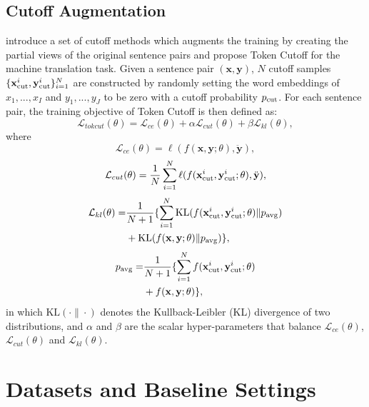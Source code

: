 \documentclass[11pt]{article}
\begin{document}
\subsection{Cutoff Augmentation}

\citet{shen2020simple} introduce a set of cutoff methods which augments the training by creating the partial views of the original sentence pairs and propose Token Cutoff for the machine translation task. Given a sentence pair $( \mathbf{x}, \mathbf{y})$, $N$ cutoff samples $\{ \mathbf{x}^i_{\rm cut}, \mathbf{y}^i_{\rm cut} \}_{i=1}^N$ are constructed by randomly setting the word embeddings of $x_1, ..., x_I$ and $y_1, ..., y_J$ to be zero with a cutoff probability $p_{\rm cut}$. For each sentence pair, the training objective of Token Cutoff is then defined as:
\begin{equation}\label{token_cutoff}
\mathcal{L}_{tokcut}(\theta) = \mathcal{L}_{ce}(\theta) + \alpha \mathcal{L}_{cut}(\theta) + \beta \mathcal{L}_{kl}(\theta),
\end{equation}
where
\begin{equation}
\mathcal{L}_{ce}(\theta) = \ell(f(\mathbf{x}, \mathbf{y}; \theta), \ddot{\mathbf{y}}),
\end{equation}
\begin{equation}
\mathcal{L}_{cut}(\theta) = \frac{1}{N}\sum_{i=1}^N\ell(f(\mathbf{x}^i_{\rm cut}, \mathbf{y}^i_{\rm cut}; \theta), \ddot{\mathbf{y}}),
\end{equation}
\begin{align}
\mathcal{L}_{kl}(\theta) = & \frac{1}{N+1} \{ \sum_{i=1}^N \text{KL}(f(\mathbf{x}^i_{\rm cut}, \mathbf{y}^i_{\rm cut}; \theta) \| p_{\rm avg}) \nonumber \\
& + \text{KL}(f(\mathbf{x}, \mathbf{y}; \theta) \| p_{\rm avg}) \},
\end{align}
\begin{align}
p_{\rm avg} = & \frac{1}{N+1} \{ \sum_{i=1}^N f(\mathbf{x}^i_{\rm cut}, \mathbf{y}^i_{\rm cut}; \theta) \nonumber \\
& + f(\mathbf{x}, \mathbf{y}; \theta) \},
\end{align}
in which $\text{KL}(\cdot \| \cdot)$ denotes the Kullback-Leibler (KL) divergence of two distributions, and $\alpha$ and $\beta$ are the scalar hyper-parameters that balance $\mathcal{L}_{ce}(\theta)$, $\mathcal{L}_{cut}(\theta)$ and $\mathcal{L}_{kl}(\theta)$.


\section{Datasets and Baseline Settings}\label{data_baseline}
\end{document}
